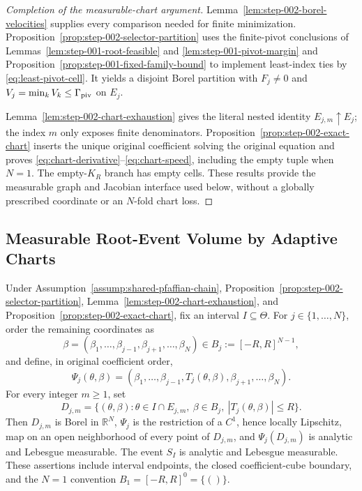 \begin{proof}[Completion of the measurable-chart argument]
Lemma~\ref{lem:step-002-borel-velocities} supplies every comparison needed
for finite minimization.  Proposition~\ref{prop:step-002-selector-partition}
uses the finite-pivot conclusions of
Lemmas~\ref{lem:step-001-root-feasible} and
\ref{lem:step-001-pivot-margin} and
Proposition~\ref{prop:step-001-fixed-family-bound} to implement least-index
ties by \eqref{eq:least-pivot-cell}.  It yields a disjoint Borel partition
with $F_j\neq0$ and
$V_j=\min_kV_k\leq\Gamma_{\rm piv}$ on $E_j$.

Lemma~\ref{lem:step-002-chart-exhaustion} gives the literal nested identity
$E_{j,m}\uparrow E_j$; the index $m$ only exposes finite denominators.
Proposition~\ref{prop:step-002-exact-chart} inserts the unique original
coefficient solving the original equation and proves
\eqref{eq:chart-derivative}--\eqref{eq:chart-speed}, including the empty
tuple when $N=1$.  The empty-$K_R$ branch has empty cells.  These results
provide the measurable graph and Jacobian interface used below, without a
globally prescribed coordinate or an $N$-fold chart loss.
\end{proof}

\subsection{Measurable Root-Event Volume by Adaptive Charts}
\label{app:step-003}

\begin{lemma}
\label{lem:step-003-measurable-charts}
Under Assumption~\ref{assump:shared-pfaffian-chain},
Proposition~\ref{prop:step-002-selector-partition},
Lemma~\ref{lem:step-002-chart-exhaustion}, and
Proposition~\ref{prop:step-002-exact-chart}, fix an interval
$I\subseteq\Theta$.  For $j\in\{1,\ldots,N\}$, order the remaining
coordinates as
\[
\beta=(\beta_1,\ldots,\beta_{j-1},\beta_{j+1},\ldots,\beta_N)
\in B_j:=[-R,R]^{N-1},
\]
and define, in original coefficient order,
\begin{equation}
\Psi_j(\theta,\beta)
=
(\beta_1,\ldots,\beta_{j-1},
T_j(\theta,\beta),
\beta_{j+1},\ldots,\beta_N).
\label{eq:step-003-insertion-map}
\end{equation}
For every integer $m\geq1$, set
\begin{equation}
D_{j,m}
=\{(\theta,\beta):
\theta\in I\cap E_{j,m},\ \beta\in B_j,\
|T_j(\theta,\beta)|\leq R\}.
\label{eq:step-003-exhausted-domain}
\end{equation}
Then $D_{j,m}$ is Borel in $\mathbb R^N$, $\Psi_j$ is the restriction of a
$C^1$, hence locally Lipschitz, map on an open neighborhood of every point
of $D_{j,m}$, and $\Psi_j(D_{j,m})$ is analytic and Lebesgue measurable.
The event $S_I$ is analytic and Lebesgue measurable.  These assertions
include interval endpoints, the closed coefficient-cube boundary, and the
$N=1$ convention $B_1=[-R,R]^0=\{()\}$.
\end{lemma}

